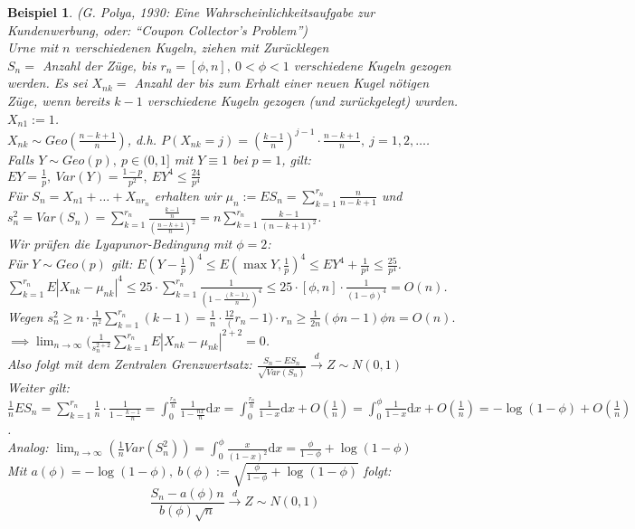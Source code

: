 \documentclass[a4paper,11pt]{book}
\def\folgt{\ensuremath{\implies}}
\def\d{\mbox{d}}
\def\dto{\stackrel{d}{\rightarrow}}
\newtheorem{Bsp}{Beispiel}[chapter]
\theoremstyle{nonumberplain}
\begin{document}
\begin{Bsp}(G. Polya, 1930: Eine Wahrscheinlichkeitsaufgabe zur Kundenwerbung, oder: \textquotedblleft Coupon Collector's Problem\textquotedblright) \label{Bsp.5.4} \\
Urne mit $n$ verschiedenen Kugeln, ziehen mit Zurücklegen \\
$S_n =$ Anzahl der Züge, bis $r_n = [\phi, n],\ 0<\phi<1$ verschiedene Kugeln gezogen werden. Es sei $X_{nk} =$ Anzahl der bis zum Erhalt einer neuen Kugel nötigen Züge, wenn bereits $k-1$ verschiedene Kugeln gezogen (und zurückgelegt) wurden. $X_{n1} := 1$. \\
$X_{nk} \sim Geo(\frac{n-k+1}{n})$, d.h. $P(X_{nk} = j) = (\frac{k-1}{n})^{j-1}\cdot\frac{n-k+1}{n},\ j=1,2,\dots$. \\
Falls $Y \sim Geo(p),\ p\in(0,1]$ mit $Y \equiv 1$ bei $p=1$, gilt: \\
$EY = \frac{1}{p},\ Var(Y) = \frac{1-p}{p^2},\ EY^4\leq\frac{24}{p^4}$ \\
Für $S_n = X_{n1} + \dots + X_{nr_n}$ erhalten wir $\mu_n := ES_n = \sum_{k=1}^{r_n}\frac{n}{n-k+1}$ und $s_n^2 = Var(S_n) = \sum_{k=1}^{r_n}\frac{\frac{k-1}{n}}{(\frac{n-k+1}{n})^2} = n\sum_{k=1}^{r_n}\frac{k-1}{(n-k+1)^2}$. \\
Wir prüfen die Lyapunor-Bedingung mit $\phi = 2$: \\
Für $Y \sim Geo(p)$ gilt: $E(Y-\frac{1}{p})^4 \leq E(\max{Y,\frac{1}{p}})^4 \leq EY^4 + \frac{1}{p^4} \leq \frac{25}{p^4}$. $\sum_{k=1}^{r_n}E|X_{nk}-\mu_{nk}|^4 \leq 25\cdot\sum_{k=1}^{r_n}\frac{1}{(1-\frac{(k-1)}{n})^4} \leq 25\cdot[\phi,n]\cdot\frac{1}{(1-\phi)^4} = O(n)$. \\
Wegen $s_n^2 \geq n\cdot\frac{1}{n^2}\sum_{k=1}^{r_n}(k-1) = \frac{1}{n}\cdot\frac{1 2}(r_n - 1)\cdot r_n \geq \frac{1}{2n}(\phi n - 1)\phi n = O(n).$ \\
$\folgt \lim_{n\to\infty}(\frac{1}{s_n^{2+2}}\sum_{k=1}^{r_n}E|X_{nk}-\mu_{nk}|^{2+2} = 0$. \\
Also folgt mit dem Zentralen Grenzwertsatz: $\frac{S_n - ES_n}{\sqrt{Var (S_n)}} \dto Z\sim N(0,1)$ \\
Weiter gilt: $\frac{1}{n}ES_n = \sum_{k=1}^{r_n}\frac{1}{n}\cdot\frac{1}{1-\frac{k-1}{n}} = \int_0^{\frac{r_n}{n}}\frac{1}{1-\frac{nx}{n}}\d x = \int_0^{\frac{r_n}{n}}\frac{1}{1-x}\d x + O(\frac{1}{n}) = \int_0^\phi \frac{1}{1-x}\d x + O(\frac{1}{n}) = -\log(1-\phi) + O(\frac{1}{n})$. \\
Analog: $\lim_{n\to\infty}(\frac{1}{n}Var(S_n^2)) = \int_0^\phi\frac{x}{(1-x)^2}\d x = \frac{\phi}{1-\phi} + \log(1-\phi)$ \\
Mit $a(\phi) = -\log(1-\phi),\ b(\phi) := \sqrt{\frac{\phi}{1-\phi} + \log(1-\phi)}$ folgt:
$$\frac{S_n - a(\phi)n}{b(\phi)\sqrt{n}} \dto Z \sim N(0,1)$$
\end{Bsp}
\end{document}

